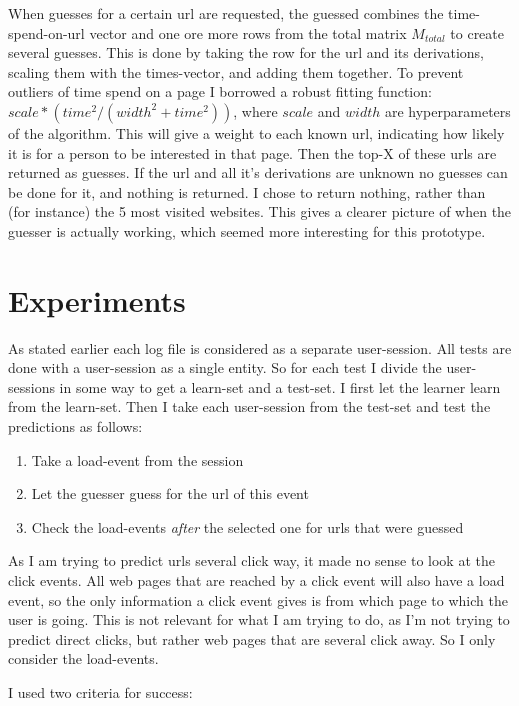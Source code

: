 \documentclass{article}
\begin{document}
When guesses for a certain url are requested, the guessed combines the time-spend-on-url vector and one ore more rows from the total matrix $M_{total}$ to create several guesses.
This is done by taking the row for the url and its derivations, scaling them with the times-vector, and adding them together.
To prevent outliers of time spend on a page I borrowed a robust fitting function: $scale * (time^2 / (width^2 + time^2))$, where $scale$ and $width$ are hyperparameters of the algorithm.
This will give a weight to each known url, indicating how likely it is for a person to be interested in that page.
Then the top-X of these urls are returned as guesses.
If the url and all it's derivations are unknown no guesses can be done for it, and nothing is returned.
I chose to return nothing, rather than (for instance) the 5 most visited websites.
This gives a clearer picture of when the guesser is actually working, which seemed more interesting for this prototype.

\section{Experiments}

As stated earlier each log file is considered as a separate user-session.
All tests are done with a user-session as a single entity.
So for each test I divide the user-sessions in some way to get a learn-set and a test-set.
I first let the learner learn from the learn-set.
Then I take each user-session from the test-set and test the predictions as follows:

\begin{enumerate}
    \item Take a load-event from the session
    \item Let the guesser guess for the url of this event
    \item Check the load-events \textit{after} the selected one for urls that were guessed
\end{enumerate}

As I am trying to predict urls several click way, it made no sense to look at the click events.
All web pages that are reached by a click event will also have a load event, so the only information a click event gives is from which page to which the user is going.
This is not relevant for what I am trying to do, as I'm not trying to predict direct clicks, but rather web pages that are several click away.
So I only consider the load-events.

I used two criteria for success:
\end{document}

